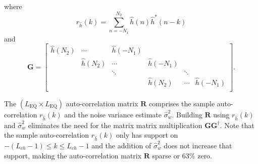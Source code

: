 where
\begin{equation}
r_{\hat{h}}(k) = \sum_{n=-N_1}^{N_2} \hat{h}(n) \hat{h}^\ast(n-k)
\label{eq:sample_autocorrelation}
\end{equation}
and
\begin{equation}
\mathbf{G} = 
		\begin{bmatrix}
		\hat{h}(N_2)		& \cdots		& \hat{h}(-N_1) 	&  				  \\
							& \hat{h}(N_2)	& \cdots 			& \hat{h}(-N_1)	  \\
				 			& 				& \ddots 			&  				& \ddots	  \\
		 					&  	   			&  					& \hat{h}(N_2)	& \cdots	& \hat{h}(-N_1)	\\
	\end{bmatrix}.
\end{equation}

The $(L_\text{EQ} \times L_\text{EQ})$ auto-correlation matrix $\mathbf{R}$ comprises the sample auto-correlation $r_{\hat{h}}(k)$ and the noise variance estimate $\hat{\sigma}^2_w$.
Building $\mathbf{R}$ using $r_{\hat{h}}(k)$ and $\hat{\sigma}^2_w$ eliminates the need for the matrix matrix multiplication $\mathbf{G}\mathbf{G}^\dagger$.
Note that the sample auto-correlation $r_{\hat{h}}(k)$ only has support on $-(L_{ch}-1) \leq k \leq L_{ch}-1$ and the addition of $\hat{\sigma}^2_w$ does not increase that support, making the auto-correlation matrix $\mathbf{R}$ sparse or $63\%$ zero.

